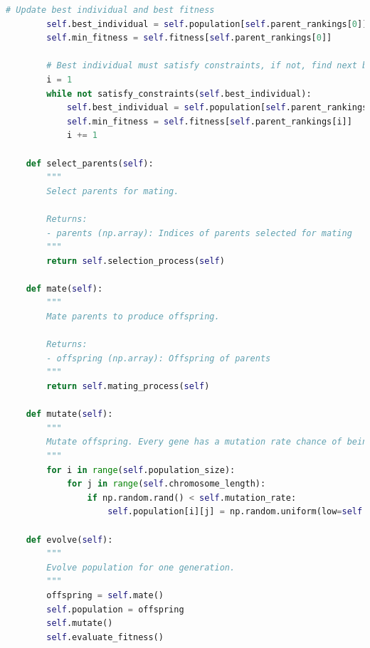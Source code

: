 \documentclass[10pt]{article}
\begin{document}
\begin{lstlisting}[language=Python, caption=CGA.py, label=CGApy]
        # Update best individual and best fitness
        self.best_individual = self.population[self.parent_rankings[0]]
        self.min_fitness = self.fitness[self.parent_rankings[0]]

        # Best individual must satisfy constraints, if not, find next best individual that does
        i = 1
        while not satisfy_constraints(self.best_individual):
            self.best_individual = self.population[self.parent_rankings[i]]
            self.min_fitness = self.fitness[self.parent_rankings[i]]
            i += 1
            
    def select_parents(self):
        """
        Select parents for mating.

        Returns:
        - parents (np.array): Indices of parents selected for mating
        """
        return self.selection_process(self)

    def mate(self):
        """
        Mate parents to produce offspring.

        Returns:
        - offspring (np.array): Offspring of parents
        """
        return self.mating_process(self)

    def mutate(self):
        """
        Mutate offspring. Every gene has a mutation rate chance of being mutated.
        """
        for i in range(self.population_size):
            for j in range(self.chromosome_length):
                if np.random.rand() < self.mutation_rate:
                    self.population[i][j] = np.random.uniform(low=self.lb, high=self.ub)

    def evolve(self):
        """
        Evolve population for one generation.
        """
        offspring = self.mate()
        self.population = offspring
        self.mutate()
        self.evaluate_fitness() 
\end{lstlisting}
\end{document}
